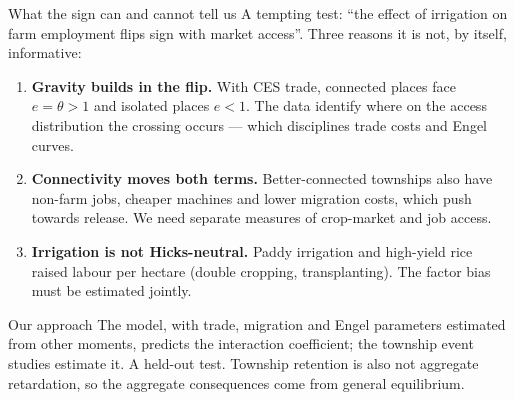 \documentclass[10pt,aspectratio=169]{beamer}
\newcommand{\hl}[1]{\textcolor{mOrange}{#1}}
\begin{document}
\begin{frame}{What the sign can and cannot tell us}
  \footnotesize
  A tempting test: ``the effect of irrigation on farm employment flips sign with market
  access''. Three reasons it is not, by itself, informative:
  \begin{enumerate}
    \item \textbf{Gravity builds in the flip.} With CES trade, connected places face
          $e=\theta>1$ and isolated places $e<1$. The data identify \hl{where} on the
          access distribution the crossing occurs --- which disciplines trade costs and
          Engel curves.
    \item \textbf{Connectivity moves both terms.} Better-connected townships also have
          non-farm jobs, cheaper machines and lower migration costs, which push towards
          release. We need \hl{separate} measures of crop-market and job access.
    \item \textbf{Irrigation is not Hicks-neutral.} Paddy irrigation and high-yield rice
          raised labour per hectare (double cropping, transplanting). The factor bias must
          be estimated jointly.
  \end{enumerate}
  \begin{exampleblock}{Our approach}
    \footnotesize
    The model, with trade, migration and Engel parameters estimated from other moments,
    \hl{predicts} the interaction coefficient; the township event studies estimate it. A
    held-out test. Township retention is also not aggregate retardation, so the
    aggregate consequences come from general equilibrium.
  \end{exampleblock}
\end{frame}
\end{document}
